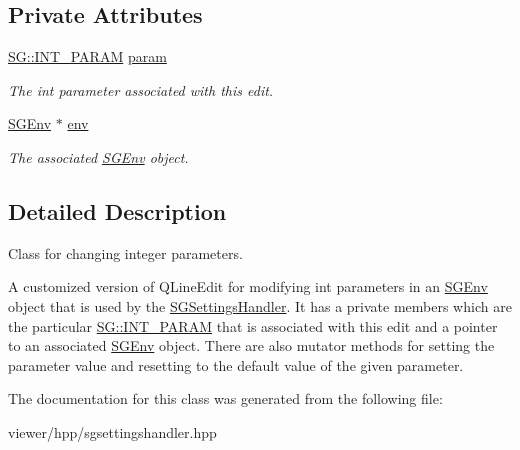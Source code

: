 \subsection*{Private Attributes}
\begin{DoxyCompactItemize}
\item 
\mbox{\label{classSGIntParamEdit_aa1ab1c2b663dc61f85a1c137dac64841}} 
\hyperlink{namespaceSG_a031898e6fc0fa14d8590f85da9715f37}{S\+G\+::\+I\+N\+T\+\_\+\+P\+A\+R\+AM} \hyperlink{classSGIntParamEdit_aa1ab1c2b663dc61f85a1c137dac64841}{param}
\begin{DoxyCompactList}\small\item\em The int parameter associated with this edit. \end{DoxyCompactList}\item 
\mbox{\label{classSGIntParamEdit_a0ecae58e72b1779e5fb99409e53f2797}} 
\hyperlink{classSGEnv}{S\+G\+Env} $\ast$ \hyperlink{classSGIntParamEdit_a0ecae58e72b1779e5fb99409e53f2797}{env}
\begin{DoxyCompactList}\small\item\em The associated \hyperlink{classSGEnv}{S\+G\+Env} object. \end{DoxyCompactList}\end{DoxyCompactItemize}


\subsection{Detailed Description}
Class for changing integer parameters. 

A customized version of Q\+Line\+Edit for modifying int parameters in an \hyperlink{classSGEnv}{S\+G\+Env} object that is used by the \hyperlink{classSGSettingsHandler}{S\+G\+Settings\+Handler}. It has a private members which are the particular \hyperlink{namespaceSG_a031898e6fc0fa14d8590f85da9715f37}{S\+G\+::\+I\+N\+T\+\_\+\+P\+A\+R\+AM} that is associated with this edit and a pointer to an associated \hyperlink{classSGEnv}{S\+G\+Env} object. There are also mutator methods for setting the parameter value and resetting to the default value of the given parameter. 

The documentation for this class was generated from the following file\+:\begin{DoxyCompactItemize}
\item 
viewer/hpp/sgsettingshandler.\+hpp\end{DoxyCompactItemize}
